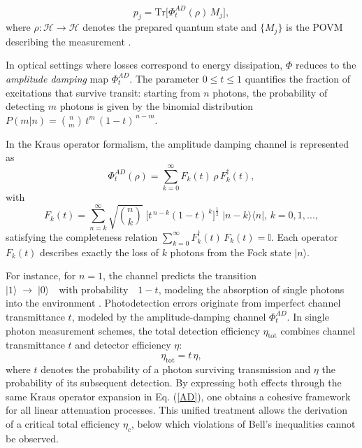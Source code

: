 \documentclass[aps,pra,reprint, superscriptaddress,showkeys]{revtex4-2}
\theoremstyle{plain}
\begin{document}
\begin{equation*}
    p_j = \mathrm{Tr}\bigl[\Phi_t^{AD}(\rho)\,M_j\bigr],
\end{equation*} 
where $\rho: \mathcal{H} \rightarrow \mathcal{H}$ denotes the prepared quantum state and $\{M_j\}$ is the POVM describing the measurement \cite{nielsen2010quantum}. 

In optical settings where losses correspond to energy dissipation, $\Phi$ reduces to the \emph{amplitude damping} map $\Phi_t^{AD}$. The parameter $0 \le t \le 1$ quantifies the fraction of excitations that survive transit: starting from $n$ photons, the probability of detecting $m$ photons is given by the binomial distribution $P(m | n) = \binom{n}{m}\,t^m\,(1-t)^{\,n-m}$.

In the Kraus operator formalism, the amplitude damping channel is represented as
\begin{equation}\label{AD}
    \Phi_t^{AD}(\rho) = \sum_{k=0}^\infty F_k(t)\,\rho\,F_k^\dagger(t),
\end{equation}
with
\begin{equation*}
    F_k(t)
= \sum_{n=k}^\infty \sqrt{\binom{n}{k}}\;\bigl[t^{\,n-k}(1-t)^{\,k}\bigr]^{\tfrac12}\;\lvert n-k\rangle\langle n\rvert,
\, k=0,1,...,
\end{equation*}
satisfying the completeness relation $\sum_{k=0}^\infty F_k^\dagger(t)\,F_k(t)=\mathbb{I}$. Each operator $F_k(t)$ describes exactly the loss of $k$ photons from the Fock state $\lvert n\rangle$.

For instance, for $n=1$, the channel predicts the transition $\lvert1\rangle \;\to\;\lvert0\rangle
\quad\text{with probability}\quad
1 - t$,
modeling the absorption of single photons into the environment \cite{mandel1995optical}. Photodetection errors originate from imperfect channel transmittance $t$, modeled by the amplitude-damping channel $\Phi_t^{AD}$. In single photon measurement schemes, the total detection efficiency $\eta_{\mathrm{tot}}$ combines channel transmittance $t$ and detector efficiency $\eta$:
\[
\eta_{\mathrm{tot}} = t \,\eta,
\]
where $t$ denotes the probability of a photon surviving transmission and $\eta$ the probability of its subsequent detection. By expressing both effects through the same Kraus operator expansion in Eq. (\ref{AD}), one obtains a cohesive framework for all linear attenuation processes. This unified treatment allows the derivation of a critical total efficiency \(\eta_c\), below which violations of Bell’s inequalities cannot be observed.
\end{document}
